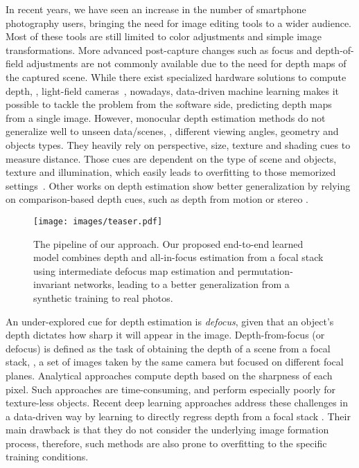 \documentclass[10pt,twocolumn,letterpaper]{article}
\begin{document}
In recent years, we have seen an increase in the number of smartphone photography users, bringing the need for image editing tools to a wider audience. 
Most of these tools are still limited to color adjustments and simple image transformations. More advanced post-capture changes such as focus and depth-of-field adjustments are not commonly available due to the need for depth maps of the captured scene.
While there exist specialized hardware solutions to compute depth, \eg, light-field cameras~\cite{DBLP:conf/cvpr/JeonPCPBTK15}, nowadays, data-driven machine learning makes it possible to tackle the problem from the software side, predicting depth maps~\cite{Guo18, DBLP:conf/cvpr/FuGWBT18,Yin_2019_ICCV} from a single image. 
However, monocular depth estimation methods do not generalize well to unseen data/scenes, \eg, different viewing angles, geometry and objects types. 
They heavily rely on perspective, size, texture and shading cues to measure distance. Those cues are dependent on the type of scene and objects, texture and illumination, which easily leads to overfitting to those memorized settings~\cite{Mancini17}.
Other works on depth estimation show better generalization by relying on comparison-based depth cues, such as depth from motion \cite{DBLP:conf/cvpr/UmmenhoferZUMID17, DBLP:conf/cvpr/MahjourianWA18} or stereo \cite{DBLP:conf/cvpr/ZhangPYT19, DBLP:conf/cvpr/SmolyanskiyKB18}. 



\begin{figure}[t]
\begin{center}
   \texttt{[image: images/teaser.pdf]}
\end{center}
   \caption{The pipeline of our approach. Our proposed end-to-end learned model combines depth and all-in-focus estimation from a focal stack using intermediate defocus map estimation and permutation-invariant networks, leading to a better generalization from a synthetic training to real photos.}
\label{fig:long}
\label{fig:cover}
\end{figure}


An under-explored cue for depth estimation is {\it defocus}, given that an object’s depth dictates how sharp it will appear in the image.
Depth-from-focus (or defocus) is defined as the task of obtaining the depth of a scene from a focal stack, \ie, a set of images taken by the same camera but focused on different focal planes. 
Analytical approaches \cite{moeller2015variational, Suwajanakorn15} compute depth based on the sharpness of each pixel. 
Such approaches are time-consuming, and perform especially poorly for texture-less objects. Recent deep learning approaches address these challenges in a data-driven way by learning to directly regress depth from a focal stack \cite{Hazirbas18}. 
Their main drawback is that they do not consider the underlying image formation process, therefore, such methods are also prone to overfitting to the specific training conditions.
\end{document}
